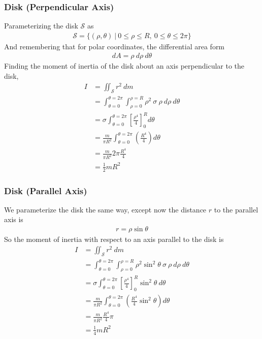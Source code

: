 \documentclass{article}
\begin{document}
\subsubsection{Disk (Perpendicular Axis)}
Parameterizing the disk $\mathcal{S}$ as 
\begin{align}
    \mathcal{S} = \{ (\rho,\theta)\ \vert\ 0 \leq \rho \leq R, \ 0 \leq \theta \leq 2\pi \} 
\end{align}
And remembering that for polar coordinates, the differential area form 
\begin{align}
    dA = \rho\ d\rho \ d\theta
\end{align}
Finding the moment of inertia of the disk about an axis perpendicular to the disk,
\begin{align}
    I &= \iint_\mathcal{S} r^2\ dm \\
    &= \int_{\theta=0}^{\theta=2\pi} \int_{\rho=0}^{\rho=R} \rho^2\ \sigma \ \rho\  d\rho \ d\theta \\
    &= \sigma \int_{\theta=0}^{\theta=2\pi} \left[\frac{\rho^4}{4}\right]^R_0 d\theta \\
    &= \frac{m}{\pi R^2} \int_{\theta=0}^{\theta=2\pi} \left(\frac{R^4}{4}\right) d\theta \\
    &= \frac{m}{\pi R^2} 2\pi \frac{R^4}{4} \\
    &= \frac{1}{2} m R^2
\end{align}
\subsubsection{Disk (Parallel Axis)}
We parameterize the disk the same way, except now the distance $r$ to the parallel axis is
\begin{align}
    r = \rho \sin \theta
\end{align}
So the moment of inertia with respect to an axis parallel to the disk is
\begin{align}
    I &= \iint_\mathcal{S} r^2\ dm \\
    &= \int_{\theta=0}^{\theta=2\pi} \int_{\rho=0}^{\rho=R} \rho^2 \sin^2 \theta \ \sigma \ \rho\  d\rho \ d\theta \\
    &= \sigma \int_{\theta=0}^{\theta=2\pi} \left[\frac{\rho^4}{4}\right]^R_0 \sin^2 \theta\ d\theta \\
    &= \frac{m}{\pi R^2} \int_{\theta=0}^{\theta=2\pi} \left(\frac{R^4}{4} \sin^2 \theta \right) d\theta \\
    &= \frac{m}{\pi R^2} \frac{R^4}{4} \pi \\
    &= \frac{1}{4} m R^2
\end{align}
\end{document}
